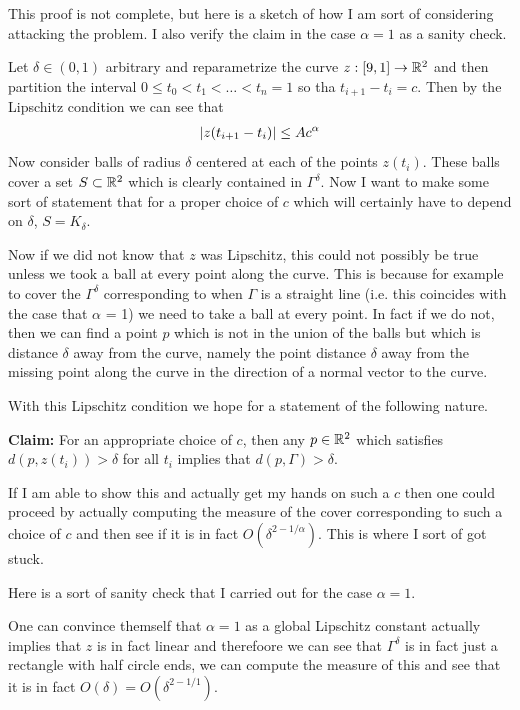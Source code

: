 \documentclass{scrartcl}
\begin{document}
\begin{solution}
This proof is not complete, but here is a sketch of how I am sort of considering attacking the problem. I also verify the claim in the case $\alpha = 1$ as a sanity check.


Let $\delta \in (0,1)$ arbitrary and reparametrize the curve $z:[9,1]\to\mathbb{R}^2$ and then partition the interval $0\leq t_0 < t_1 < \dots < t_n = 1$ so tha $t_{i+1} - t_i = c$. Then by the Lipschitz
condition we can see that \begin{align*}
    \lvert z(t_{i+1}- t_i)\vert \leq Ac^\alpha
\end{align*} Now consider balls of radius $\delta$ centered at each of the points $z(t_i)$. These balls cover a set $S\subset \mathbb{R}^2$ which is clearly contained in $\Gamma^\delta$.
Now I want to make some sort of statement that for a proper choice of $c$ which will certainly have to depend on $\delta$, $S = K_\delta$.

\hfill

Now if we did not know that $z$ was Lipschitz, this could not possibly be true unless we took a ball at every point along the curve. This is because for example to cover the $\Gamma^\delta$
corresponding to when $\Gamma$ is a straight line (i.e. this coincides with the case that $\alpha$ = 1) we need to take a ball at every point. In fact if we do not, then we can find a point $p$ which is not in the union of the balls but
which is distance $\delta$ away from the curve, namely the point distance $\delta$ away from the missing point along the curve in the direction of a normal vector to the curve.

\hfill 

With this Lipschitz condition we hope for a statement of the following nature. 

\textbf{Claim:} For an appropriate choice of $c$, then any $p\in\mathbb{R}^2$ which satisfies $d(p,z(t_i)) > \delta$ for all $t_i$ implies that $d(p,\Gamma) > \delta$.

If I am able to show this and actually get my hands on such a $c$ then one could proceed by actually computing the measure of the cover corresponding to such a choice
of $c$ and then see if it is in fact $O(\delta^{2-1/\alpha})$. This is where I sort of got stuck. 

\hfill

Here is a sort of sanity check that I carried out for the case $\alpha = 1$.

One can convince themself that $\alpha = 1$ as a global Lipschitz constant actually implies that $z$ is in fact linear and therefoore we can see that $\Gamma^\delta$ is in fact
just a rectangle with half circle ends, we can compute the measure of this and see that it is in fact $O(\delta) = O(\delta^{2-1/1})$.
\end{solution}
\end{document}

